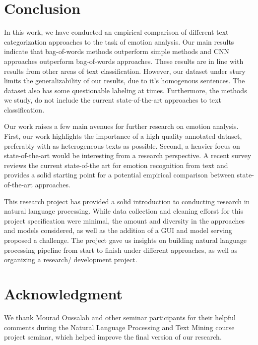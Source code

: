 \documentclass[conference]{IEEEtran}
\begin{document}
\section{Conclusion}

In this work, we have conducted an empirical comparison of different text categorization approaches to the task of emotion analysis. Our main results indicate that bag-of-words methods outperform simple methods and CNN approaches outperform bag-of-words approaches. These results are in line with results from other areas of text classification. However, our dataset under stury limits the generalizability of our results, due to it's homogenous sentences. The dataset also has some questionable labeling at times. Furthermore, the methods we study, do not include the current state-of-the-art approaches to text classification.

Our work raises a few main avenues for further research on emotion analysis. First, our work highlights the importance of a high quality annotated dataset, preferably with as heterogeneous texts as possible. Second, a heavier focus on state-of-the-art would be interesting from a research perspective. A recent survey \cite{alswaidan2020survey} reviews the current state-of-the art for emotion recognition from text and provides a solid starting point for a potential empirical comparison between state-of-the-art approaches.

This research project has provided a solid introduction to conducting research in natural language processing. While data collection and cleaning efforst for this project specification were minimal, the amount and diversity in the approaches and models considered, as well as the addition of a GUI and model serving proposed a challenge. The project gave us insights on building natural language processing pipeline from start to finish under different approaches, as well as organizing a research/ development project.

\section*{Acknowledgment}

We thank Mourad Oussalah and other seminar participants for their helpful comments during
 the Natural Language Processing and Text Mining course project seminar, which helped improve the final version of our research.



\end{document}
